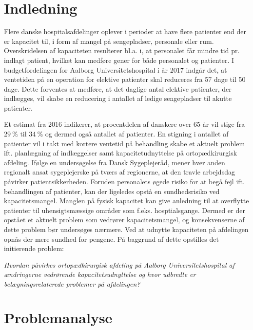 \chapter{Indledning}
Flere danske hospitalsafdelinger oplever i perioder at have flere patienter end der er kapacitet til, i form af mangel på sengepladser, personale eller rum\cite{Company2013}. Overskridelsen af kapaciteten resulterer bl.a. i, at personalet får mindre tid pr. indlagt patient, hvilket kan medføre gener for både personalet og patienter.\cite{Kjeldsen2015} I budgetfordelingen for Aalborg Universitetshospital i år 2017 indgår det, at ventetiden på en operation for elektive patienter skal reduceres fra 57 dage til 50 dage\cite{Budget2016}. Dette forventes at medføre, at det daglige antal elektive patienter, der indlægges, vil skabe en reducering i antallet af ledige sengepladser til akutte patienter. 

Et estimat fra 2016 indikerer, at procentdelen af danskere over 65 år vil stige fra $29~\%$ til $34~\%$ og dermed også antallet af patienter\cite{RegionNord2016}. En stigning i antallet af patienter vil i takt med kortere ventetid på behandling skabe et aktuelt problem ift. planlægning af indlæggelser samt kapacitetudnyttelse på ortopædkirurgisk afdeling. Ifølge en undersøgelse fra Dansk Sygeplejeråd, mener hver anden regionalt ansat sygeplejerske på tværs af regionerne, at den travle arbejdsdag påvirker patientsikkerheden\cite{Kjeldsen2015}. Foruden personalets øgede risiko for at begå fejl ift. behandlingen af patienter, kan der ligeledes opstå en sundhedsrisiko ved kapacitetsmangel. Manglen på fysisk kapacitet kan give anledning til at overflytte patienter til uhensigtsmæssige områder som f.eks. hosptialsgange\cite{Madsen2014}. Dermed er der opstået et aktuelt problem som vedrører kapacitetsmangel, og konsekvenserne af dette problem bør undersøges nærmere. Ved at udnytte kapaciteten på afdelingen opnås der mere sundhed for pengene\cite{Company2013}. På baggrund af dette opstilles det initierende problem:

\textit{Hvordan påvirkes ortopædkirurgisk afdeling på Aalborg Universitetshospital af ændringerne vedrørende kapacitetsudnyttelse og hvor udbredte er belægningsrelaterede problemer på afdelingen?}


\chapter{Problemanalyse}
